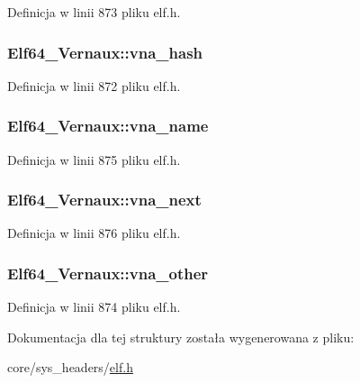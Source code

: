 Definicja w linii 873 pliku elf.\-h.

\hypertarget{struct_elf64___vernaux_ae41cce47b72e2232f3880843ab550649}{
\subsubsection[{vna\-\_\-hash}]{ Elf64\-\_\-\-Vernaux\-::vna\-\_\-hash}}\label{struct_elf64___vernaux_ae41cce47b72e2232f3880843ab550649}


Definicja w linii 872 pliku elf.\-h.

\hypertarget{struct_elf64___vernaux_a4c83e76a256ad7fe7058df7ee9493c5c}{
\subsubsection[{vna\-\_\-name}]{ Elf64\-\_\-\-Vernaux\-::vna\-\_\-name}}\label{struct_elf64___vernaux_a4c83e76a256ad7fe7058df7ee9493c5c}


Definicja w linii 875 pliku elf.\-h.

\hypertarget{struct_elf64___vernaux_a565bd1e8b3ae2f45854f8163629444fc}{
\subsubsection[{vna\-\_\-next}]{ Elf64\-\_\-\-Vernaux\-::vna\-\_\-next}}\label{struct_elf64___vernaux_a565bd1e8b3ae2f45854f8163629444fc}


Definicja w linii 876 pliku elf.\-h.

\hypertarget{struct_elf64___vernaux_a56e3d7fee69c7b55556297757e1977e5}{
\subsubsection[{vna\-\_\-other}]{ Elf64\-\_\-\-Vernaux\-::vna\-\_\-other}}\label{struct_elf64___vernaux_a56e3d7fee69c7b55556297757e1977e5}


Definicja w linii 874 pliku elf.\-h.



Dokumentacja dla tej struktury została wygenerowana z pliku\-:\begin{DoxyCompactItemize}
\item 
core/sys\-\_\-headers/\hyperlink{elf_8h}{elf.\-h}\end{DoxyCompactItemize}
